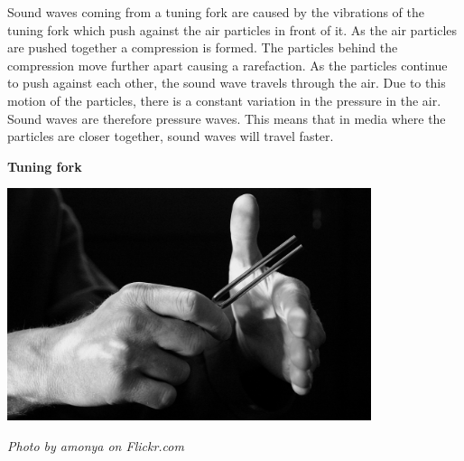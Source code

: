 \begin{minipage}{.5\textwidth}
      \label{m38783*id293458}Sound waves coming from a tuning fork are caused by the vibrations of the tuning fork which push against the air particles in front of it. As the air particles are pushed together a compression is formed. The particles behind the compression move further apart causing a rarefaction. As the particles continue to push against each other,
the sound wave travels through the air. Due to this motion of the particles, there is a constant variation in the pressure in the air. Sound waves are therefore pressure waves. This means that in media where the particles are closer together, sound waves will travel faster.
\end{minipage}
\begin{minipage}{.5\textwidth}\begin{center}
\textbf{Tuning fork}\par
    \includegraphics[width=0.8\textwidth]{photos/TuningFork2_Flickr_amonya.jpg}\par
\textit{Photo by amonya on Flickr.com}
\end{center}
\end{minipage}

